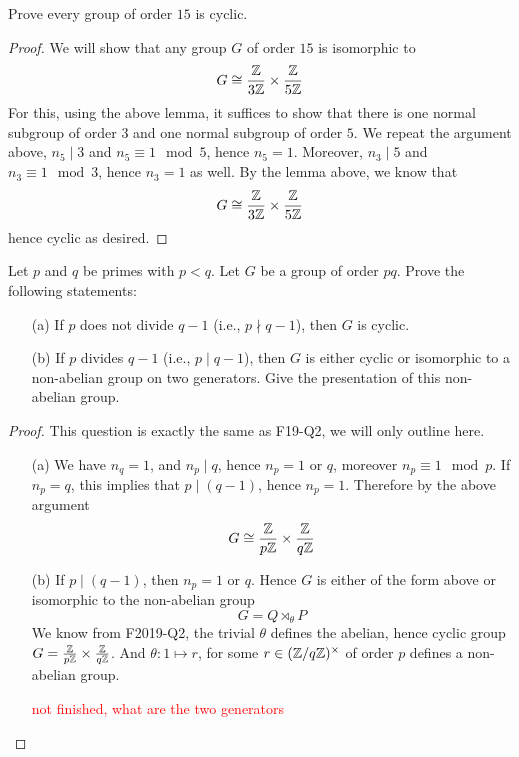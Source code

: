 \begin{prob}[F2015-Q1]
    Prove every group of order $15$ is cyclic.
\end{prob}
\begin{proof}
    We will show that any group $G$ of order $15$ is isomorphic to 
    \begin{equation*}
        G\cong\frac{\mathbb{Z}}{3\mathbb{Z}}\times\frac{\mathbb{Z}}{5\mathbb{Z}}
    \end{equation*}
    For this, using the above lemma, it suffices to show that there is one normal subgroup of order $3$ and one normal subgroup of order $5$. We repeat the argument above, $n_5\mid 3$ and $n_5\equiv 1\mod 5$, hence $n_5=1$. Moreover, $n_3\mid 5$ and $n_3\equiv 1\mod 3$, hence $n_3=1$ as well. By the lemma above, we know that 
    \begin{equation*}
        G\cong\frac{\mathbb{Z}}{3\mathbb{Z}}\times\frac{\mathbb{Z}}{5\mathbb{Z}}
    \end{equation*}
    hence cyclic as desired.
\end{proof}

\begin{prob}[S2013-Q2]
Let \( p \) and \( q \) be primes with \( p < q \). Let \( G \) be a group of order \( pq \). Prove the following statements:

\begin{itemize}
    \item[(a)] If \( p \) does not divide \( q - 1 \) (i.e., \( p \nmid q - 1 \)), then \( G \) is cyclic.

    \item[(b)] If \( p \) divides \( q - 1 \) (i.e., \( p \mid q - 1 \)), then \( G \) is either cyclic or isomorphic to a non-abelian group on two generators. Give the presentation of this non-abelian group.
\end{itemize}
\end{prob}
\begin{proof}
    This question is exactly the same as  F19-Q2, we will only outline here.
    \begin{itemize}
        \item[(a)] We have $n_q=1$, and $n_p\mid q$, hence $n_p=1$ or $q$, moreover $n_p\equiv 1\mod p$. If $n_p=q$, this implies that $p\mid(q-1)$, hence $n_p=1$. Therefore by the above argument
        \begin{equation*}
            G\cong\frac{\mathbb{Z}}{p\mathbb{Z}}\times\frac{\mathbb{Z}}{q\mathbb{Z}}
        \end{equation*}
        \item[(b)] If $p\mid(q-1)$, then $n_p=1$ or $q$. Hence $G$ is either of the form above or isomorphic to the non-abelian group 
        \begin{equation*}
            G=Q\rtimes_\theta P
        \end{equation*}
        We know from F2019-Q2, the trivial $\theta$ defines the abelian, hence cyclic group $G=\frac{\mathbb{Z}}{p\mathbb{Z}}\times\frac{\mathbb{Z}}{q\mathbb{Z}}$. And $\theta: 1\mapsto r$, for some $r\in(\mathbb{Z}/q\mathbb{Z})^\times$ of order $p$ defines a non-abelian group. 

    \textcolor{red}{not finished, what are the two generators}        
    \end{itemize}
\end{proof}


